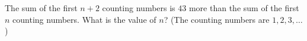 The sum of the first $n+2$ counting numbers is $43$ more than the sum of the first $n$ counting numbers. What is the value of $n$? (The counting numbers are $1,2,3,\dots$)
